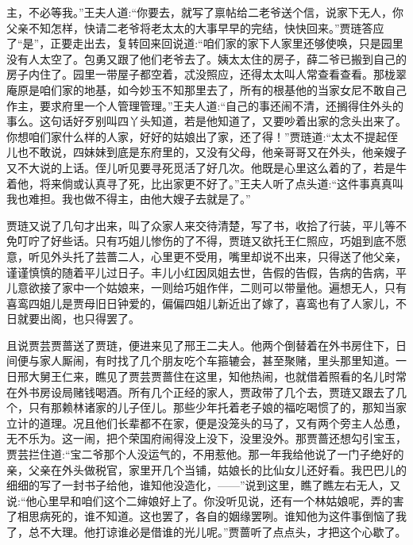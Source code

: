 \begin{parag}
主，不必等我。”王夫人道:“你要去，就写了禀帖给二老爷送个信，说家下无人，你父亲不知怎样，快请二老爷将老太太的大事早早的完结，快快回来。”贾琏答应了“是”，正要走出去，复转回来回说道:“咱们家的家下人家里还够使唤，只是园里没有人太空了。包勇又跟了他们老爷去了。姨太太住的房子，薛二爷已搬到自己的房子内住了。园里一带屋子都空着，忒没照应，还得太太叫人常查看查看。那栊翠庵原是咱们家的地基，如今妙玉不知那里去了，所有的根基他的当家女尼不敢自己作主，要求府里一个人管理管理。”王夫人道:“自己的事还闹不清，还搁得住外头的事么。这句话好歹别叫四丫头知道，若是他知道了，又要吵着出家的念头出来了。你想咱们家什么样的人家，好好的姑娘出了家，还了得！”贾琏道:“太太不提起侄儿也不敢说，四妹妹到底是东府里的，又没有父母，他亲哥哥又在外头，他亲嫂子又不大说的上话。侄儿听见要寻死觅活了好几次。他既是心里这么着的了，若是牛着他，将来倘或认真寻了死，比出家更不好了。”王夫人听了点头道:“这件事真真叫我也难担。我也做不得主，由他大嫂子去就是了。”
\end{parag}


\begin{parag}
    贾琏又说了几句才出来，叫了众家人来交待清楚，写了书，收拾了行装，平儿等不免叮咛了好些话。只有巧姐儿惨伤的了不得，贾琏又欲托王仁照应，巧姐到底不愿意，听见外头托了芸蔷二人，心里更不受用，嘴里却说不出来，只得送了他父亲，谨谨慎慎的随着平儿过日子。丰儿小红因凤姐去世，告假的告假，告病的告病，平儿意欲接了家中一个姑娘来，一则给巧姐作伴，二则可以带量他。遍想无人，只有喜鸾四姐儿是贾母旧日钟爱的，偏偏四姐儿新近出了嫁了，喜鸾也有了人家儿，不日就要出阁，也只得罢了。
\end{parag}


\begin{parag}
    且说贾芸贾蔷送了贾琏，便进来见了邢王二夫人。他两个倒替着在外书房住下，日间便与家人厮闹，有时找了几个朋友吃个车箍辘会，甚至聚赌，里头那里知道。一日邢大舅王仁来，瞧见了贾芸贾蔷住在这里，知他热闹，也就借着照看的名儿时常在外书房设局赌钱喝酒。所有几个正经的家人，贾政带了几个去，贾琏又跟去了几个，只有那赖林诸家的儿子侄儿。那些少年托着老子娘的福吃喝惯了的，那知当家立计的道理。况且他们长辈都不在家，便是没笼头的马了，又有两个旁主人怂恿，无不乐为。这一闹，把个荣国府闹得没上没下，没里没外。那贾蔷还想勾引宝玉，贾芸拦住道:“宝二爷那个人没运气的，不用惹他。那一年我给他说了一门子绝好的亲，父亲在外头做税官，家里开几个当铺，姑娘长的比仙女儿还好看。我巴巴儿的细细的写了一封书子给他，谁知他没造化，——”说到这里，瞧了瞧左右无人，又说:“他心里早和咱们这个二婶娘好上了。你没听见说，还有一个林姑娘呢，弄的害了相思病死的，谁不知道。这也罢了，各自的姻缘罢咧。谁知他为这件事倒恼了我了，总不大理。他打谅谁必是借谁的光儿呢。”贾蔷听了点点头，才把这个心歇了。
\end{parag}


